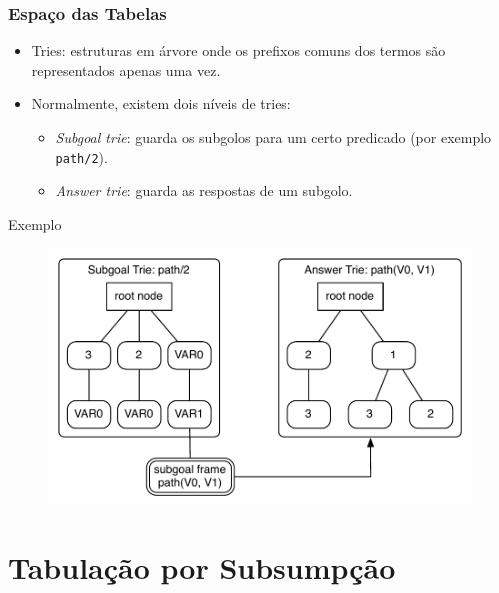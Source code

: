 \documentclass{beamer}
\begin{document}
\begin{frame}
   \frametitle{Espaço das Tabelas}
   \begin{itemize}
      \item Tries: estruturas em árvore onde os prefixos comuns dos termos são representados apenas uma vez.
      \pause
      \item Normalmente, existem dois níveis de tries:
         \begin{itemize}
            \item \emph{Subgoal trie}: guarda os subgolos para um certo predicado (por exemplo \texttt{path/2}).
            \item \emph{Answer trie}: guarda as respostas de um subgolo.
         \end{itemize}
      \pause
   \end{itemize}
   \begin{block}{Exemplo}
     \begin{figure}[ht]
        \centering
          \includegraphics[scale=0.45]{two_level_tries.pdf}
      \end{figure}
    \end{block}
\end{frame}

\section{Tabulação por Subsumpção}
\end{document}
